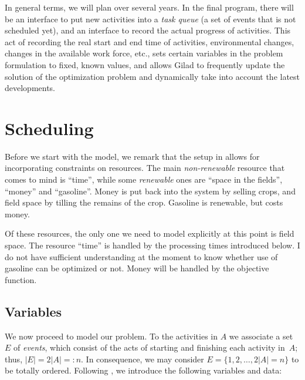 \documentclass[11pt,reqno]{amsart}
\numberwithin{equation}{section}
\begin{document}
In general terms, we will plan over several years. In the final
program, there will be an interface to put new activities into a
\emph{task queue} (a set of events that is not scheduled yet), and an
interface to record the actual progress of activities. This act of
recording the real start and end time of activities, environmental
changes, changes in the available work force, etc., sets certain
variables in the problem formulation to fixed, known values, and
allows Gilad to frequently update the solution of the optimization
problem and dynamically take into account the latest developments.

\section{Scheduling}

Before we start with the model, we remark that the setup in \cite{artigues-etal11} allows
for incorporating constraints on resources. The main \emph{non-renewable} resource that
comes to mind is ``time'', while some  \emph{renewable} ones are ``space in the
fields'', ``money'' and ``gasoline''. Money is put back into the system by selling 
crops, and field space by tilling the remains of the crop. Gasoline is renewable, but
costs money.

Of these resources, the only one we need to model explicitly at this point is field
space. The resource ``time'' is handled by the processing times introduced below. I do not
have sufficient understanding at the moment to know whether use of gasoline can be
optimized or not. Money will be handled by the objective function.

\subsection{Variables}

We now proceed to model our problem.  To the activities in $A$ we associate a set~$E$ of
\emph{events}, which consist of the acts of starting and finishing each activity in~$A$;
thus, $|E|=2|A|=:n$. In consequence, we may consider $E=\{1,2,\dots, 2|A|=n\}$ to be
totally ordered.  Following \cite{artigues-etal11}, we introduce the following variables
and data:
\end{document}
